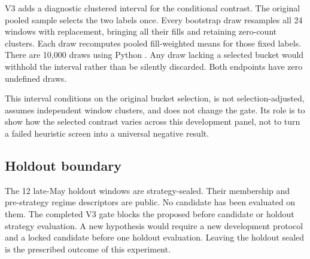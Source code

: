V3 adds a diagnostic clustered interval for the conditional contrast. The
original pooled sample selects the two labels once. Every bootstrap draw
resamples all 24 windows with replacement, bringing all their fills and
retaining zero-count clusters. Each draw recomputes pooled fill-weighted means
for those fixed labels. There are 10,000 draws using Python .
Any draw lacking a selected bucket would withhold the interval rather than be
silently discarded. Both endpoints have zero undefined draws.

This interval conditions on the original bucket selection, is not
selection-adjusted, assumes independent window clusters, and does not change
the gate. Its role is to show how the selected contrast varies across this
development panel, not to turn a failed heuristic screen into a universal
negative result.

\subsection{Holdout boundary}

The 12 late-May holdout windows are strategy-sealed. Their membership and
pre-strategy regime descriptors are public. No candidate has been evaluated
on them. The completed V3 gate blocks the proposed  before
candidate or holdout strategy evaluation. A new hypothesis would require a new
development protocol and a locked candidate before one holdout evaluation.
Leaving the holdout sealed is the prescribed outcome of this experiment.
